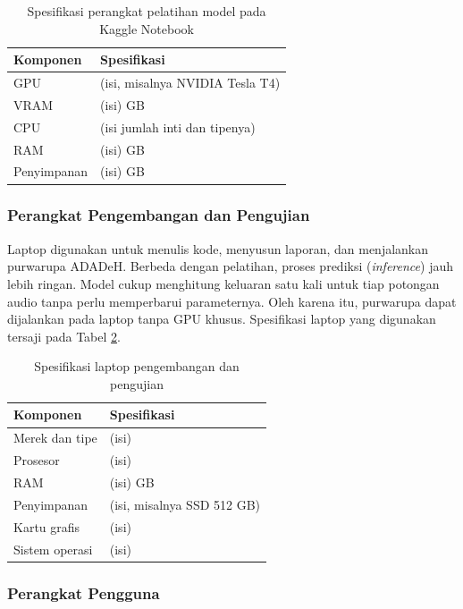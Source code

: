 \begin{table}[t]
  \centering
  \caption{Spesifikasi perangkat pelatihan model pada Kaggle Notebook}
  \label{tab:spek_training}
  \begin{tabularx}{0.8\textwidth}{| l | X |}
    \hline
    \textbf{Komponen} & \textbf{Spesifikasi} \\
    \hline
    GPU   & (isi, misalnya NVIDIA Tesla T4) \\
    VRAM  & (isi) GB \\
    CPU   & (isi jumlah inti dan tipenya) \\
    RAM   & (isi) GB \\
    Penyimpanan & (isi) GB \\
    \hline
  \end{tabularx}
\end{table}

\subsubsection{Perangkat Pengembangan dan Pengujian}
\label{hw_dev}

Laptop digunakan untuk menulis kode, menyusun laporan, dan menjalankan purwarupa ADADeH. Berbeda dengan pelatihan, proses prediksi (\textit{inference}) jauh lebih ringan. Model cukup menghitung keluaran satu kali untuk tiap potongan audio tanpa perlu memperbarui parameternya. Oleh karena itu, purwarupa dapat dijalankan pada laptop tanpa GPU khusus. Spesifikasi laptop yang digunakan tersaji pada Tabel \ref{tab:spek_laptop}.

\begin{table}[t]
  \centering
  \caption{Spesifikasi laptop pengembangan dan pengujian}
  \label{tab:spek_laptop}
  \begin{tabularx}{0.8\textwidth}{| l | X |}
    \hline
    \textbf{Komponen} & \textbf{Spesifikasi} \\
    \hline
    Merek dan tipe  & (isi) \\
    Prosesor        & (isi) \\
    RAM             & (isi) GB \\
    Penyimpanan     & (isi, misalnya SSD 512 GB) \\
    Kartu grafis    & (isi) \\
    Sistem operasi  & (isi) \\
    \hline
  \end{tabularx}
\end{table}

\subsubsection{Perangkat Pengguna}
\label{hw_user}

